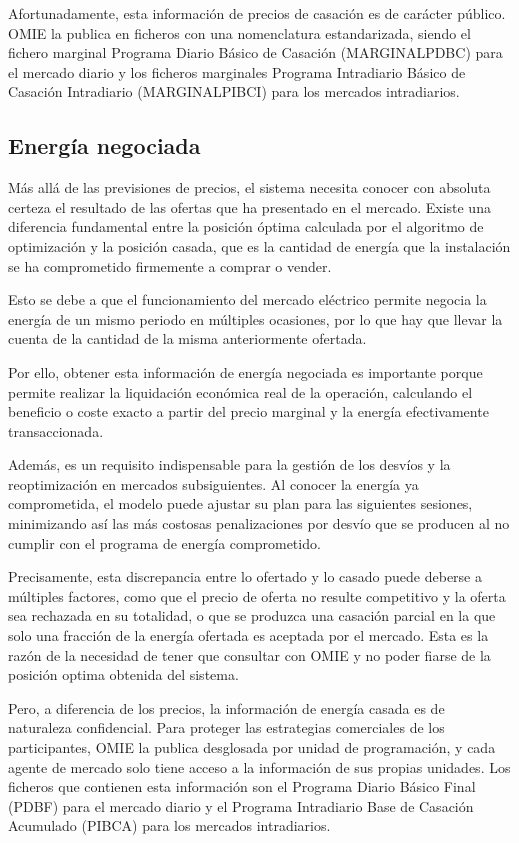 Afortunadamente, esta información de precios de casación es de carácter público. OMIE la publica en ficheros con una nomenclatura estandarizada, siendo el fichero marginal Programa Diario Básico de Casación (MARGINALPDBC) para el mercado diario y los ficheros marginales Programa Intradiario Básico de Casación Intradiario (MARGINALPIBCI) para los mercados intradiarios.

\subsection{Energía negociada}
\label{makereference4.1.2}

Más allá de las previsiones de precios, el sistema necesita conocer con absoluta certeza el resultado de las ofertas que ha presentado en el mercado. Existe una diferencia fundamental entre la posición óptima calculada por el algoritmo de optimización y la posición casada, que es la cantidad de energía que la instalación se ha comprometido firmemente a comprar o vender.

Esto se debe a que el funcionamiento del mercado eléctrico permite negocia la energía de un mismo periodo en múltiples ocasiones, por lo que hay que llevar la cuenta de la cantidad de la misma anteriormente ofertada.

Por ello, obtener esta información de energía negociada es importante porque permite realizar la liquidación económica real de la operación, calculando el beneficio o coste exacto a partir del precio marginal y la energía efectivamente transaccionada. 

Además, es un requisito indispensable para la gestión de los desvíos y la reoptimización en mercados subsiguientes. Al conocer la energía ya comprometida, el modelo puede ajustar su plan para las siguientes sesiones, minimizando así las más costosas penalizaciones por desvío que se producen al no cumplir con el programa de energía comprometido.

Precisamente, esta discrepancia entre lo ofertado y lo casado puede deberse a múltiples factores, como que el precio de oferta no resulte competitivo y la oferta sea rechazada en su totalidad, o que se produzca una casación parcial en la que solo una fracción de la energía ofertada es aceptada por el mercado. Esta es la razón de la necesidad de tener que consultar con OMIE y no poder fiarse de la posición optima obtenida del sistema.

Pero, a diferencia de los precios, la información de energía casada es de naturaleza confidencial. Para proteger las estrategias comerciales de los participantes, OMIE la publica desglosada por unidad de programación, y cada agente de mercado solo tiene acceso a la información de sus propias unidades. Los ficheros que contienen esta información son el Programa Diario Básico Final (PDBF) para el mercado diario y el Programa Intradiario Base de Casación Acumulado (PIBCA) para los mercados intradiarios.

